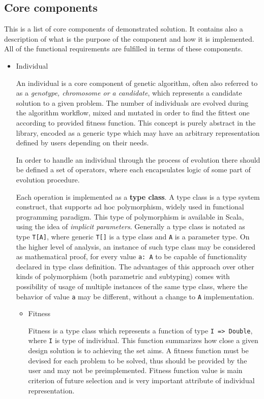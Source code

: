 \subsection{Core components}

This is a list of core components of demonstrated solution. It contains also a description of what is the purpose of the component and how it is implemented. All of the functional requirements are fulfilled in terms of these components.

\begin{itemize}

\item
Individual

An individual is a core component of genetic algorithm, often also referred to as a \textit{genotype, chromosome \emph{or} a candidate}, which represents a candidate solution to a given problem. The number of individuals are evolved during the algorithm workflow, mixed and mutated in order to find the fittest one according to provided fitness function. This concept is purely abstract in the library, encoded as a generic type which may have an arbitrary representation defined by users depending on their needs. 

In order to handle an individual through the process of evolution there should be defined a set of operators, where each encapsulates logic of some part of evolution procedure. 

Each operation is implemented as a \textbf{type class}. A type class is a type system construct, that supports ad hoc polymorphism, widely used in functional programming paradigm. This type of polymorphism is available in Scala, using the idea of \textit{implicit parameters}. Generally a type class is notated as type \texttt{T[A]}, where generic \texttt{T[]} is a type class and \texttt{A} is a parameter type. On the higher level of analysis, an instance of such type class may be considered as mathematical proof, for every value \texttt{a: A} to be capable of functionality declared in type class definition. The advantages of this approach over other kinds of polymorphism (both parametric and subtyping) comes with possibility of usage of multiple instances of the same type class, where the behavior of value \texttt{a} may be different, without a change to \texttt{A} implementation.
\medbreak

\begin{itemize}
\item
Fitness

Fitness is a type class which represents a function of type \texttt{I => Double}, where \texttt{I} is type of individual. This function summarizes how close a given design solution is to achieving the set aims. A fitness function must be devised for each problem to be solved, thus should be provided by the user and may not be preimplemented. Fitness function value is main criterion of future selection and is very important attribute of individual representation.


\end{itemize}
\end{itemize}
